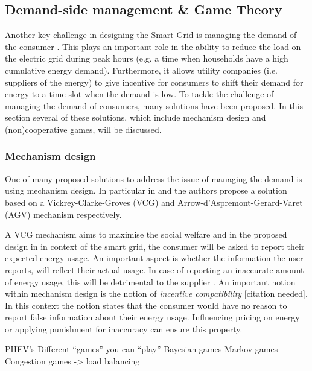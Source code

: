 \subsection{Demand-side management \& Game Theory}
Another key challenge in designing the Smart Grid is managing the demand of the consumer \cite{keypaper}. This plays an important role in the ability to reduce the load on the electric grid during peak hours (e.g. a time when households have a high cumulative energy demand). Furthermore, it allows utility companies (i.e. suppliers of the energy) to give incentive for consumers to shift their demand for energy to a time slot when the demand is low.  To tackle the challenge of managing the demand of consumers, many solutions have been proposed. In this section several of these solutions, which include mechanism design and (non)cooperative games, will be discussed. 

\subsubsection{Mechanism design}
One of many proposed solutions to address the issue of managing the demand is using mechanism design. In particular in \cite{SamadiMohsenian-RadSchoberEtAl2012} and \cite{MaDengSongEtAl2014} the authors propose a solution based on a Vickrey-Clarke-Groves (VCG) and Arrow-d'Aspremont-Gerard-Varet (AGV) mechanism respectively.

A VCG mechanism aims to maximise the social welfare \cite{ShohamLeyton-Brown2008} and in the proposed design in \cite{SamadiMohsenian-RadSchoberEtAl2012} in context of the smart grid, the consumer will be asked to report their expected energy usage. An important aspect is whether the information the user reports, will reflect their actual usage. In case of reporting an inaccurate amount of energy usage, this will be detrimental to the supplier \cite{MaDengSongEtAl2014}. An important notion within mechanism design is the notion of \textit{incentive compatibility} [citation needed]. In this context the notion states that the consumer would have no reason to report false information about their energy usage. Influencing pricing on energy \cite{SamadiMohsenian-RadSchoberEtAl2012} or applying punishment for inaccuracy \cite{MaDengSongEtAl2014} can ensure this property.


PHEV’s
Different “games” you can “play”
Bayesian games
Markov games
Congestion games -> load balancing